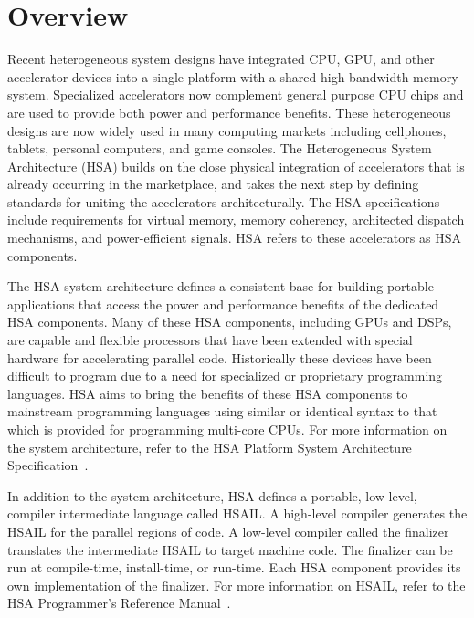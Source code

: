 \documentclass[final,oneside]{book}
\begin{document}
\section{Overview}\label{overview}
\vspace{-3mm}
Recent heterogeneous system designs have integrated CPU, GPU, and other
accelerator devices into a single platform with a shared high-bandwidth memory
system.  Specialized accelerators now complement general purpose CPU chips and
are used to provide both power and performance benefits.  These
heterogeneous designs are now widely used in many computing markets including
cellphones, tablets, personal computers, and game consoles. The Heterogeneous
System Architecture (HSA) builds on the close physical integration of
accelerators that is already occurring in the marketplace, and takes the next
step by defining standards for uniting the accelerators architecturally. The HSA
specifications include requirements for virtual memory, memory coherency,
architected dispatch mechanisms, and power-efficient signals. HSA refers to
these accelerators as HSA components.

The HSA system architecture defines a consistent base for building portable
applications that access the power and performance benefits of the dedicated HSA
components. Many of these HSA components, including GPUs and DSPs, are capable and
flexible processors that have been extended with special hardware for
accelerating parallel code. Historically these devices have been difficult to
program due to a need for specialized or proprietary programming languages. HSA
aims to bring the benefits of these HSA components to mainstream programming
languages using similar or identical syntax to that which is provided for
programming multi-core CPUs. For more information on the system architecture,
refer to the HSA Platform System Architecture Specification~\cite{sar}.

In addition to the system architecture, HSA defines a portable, low-level,
compiler intermediate language called HSAIL.  A high-level compiler
generates the HSAIL for the parallel regions of code. A low-level compiler
called the finalizer translates the intermediate HSAIL to target machine
code. The finalizer can be run at compile-time, install-time, or run-time. Each
HSA component provides its own implementation of the finalizer.  For more
information on HSAIL, refer to the HSA Programmer's Reference Manual~\cite{prm}.
\end{document}
